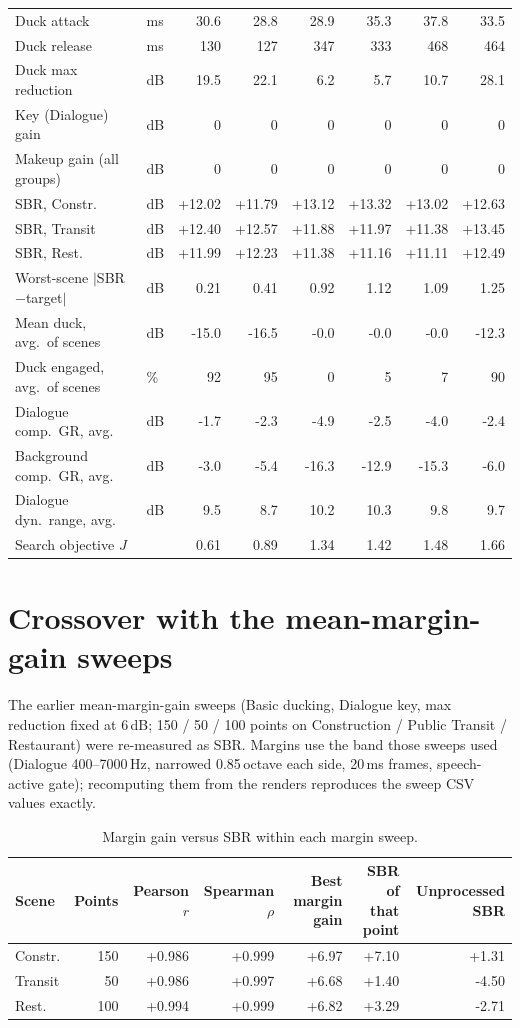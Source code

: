 \documentclass[11pt]{article}
\begin{document}
\begin{table}[H]
\begin{tabular}{@{}l l rrrrrr@{}}
Duck attack & ms & 30.6 & 28.8 & 28.9 & 35.3 & 37.8 & 33.5 \\
Duck release & ms & 130 & 127 & 347 & 333 & 468 & 464 \\
Duck max reduction & dB & 19.5 & 22.1 & 6.2 & 5.7 & 10.7 & 28.1 \\
Key (Dialogue) gain & dB & 0 & 0 & 0 & 0 & 0 & 0 \\
Makeup gain (all groups) & dB & 0 & 0 & 0 & 0 & 0 & 0 \\
\midrule
SBR, Constr. & dB & +12.02 & +11.79 & +13.12 & +13.32 & +13.02 & +12.63 \\
SBR, Transit & dB & +12.40 & +12.57 & +11.88 & +11.97 & +11.38 & +13.45 \\
SBR, Rest. & dB & +11.99 & +12.23 & +11.38 & +11.16 & +11.11 & +12.49 \\
Worst-scene $|$SBR$-$target$|$ & dB & 0.21 & 0.41 & 0.92 & 1.12 & 1.09 & 1.25 \\
Mean duck, avg.\ of scenes & dB & -15.0 & -16.5 & -0.0 & -0.0 & -0.0 & -12.3 \\
Duck engaged, avg.\ of scenes & \% & 92 & 95 & 0 & 5 & 7 & 90 \\
Dialogue comp.\ GR, avg.\ & dB & -1.7 & -2.3 & -4.9 & -2.5 & -4.0 & -2.4 \\
Background comp.\ GR, avg.\ & dB & -3.0 & -5.4 & -16.3 & -12.9 & -15.3 & -6.0 \\
Dialogue dyn.\ range, avg.\ & dB & 9.5 & 8.7 & 10.2 & 10.3 & 9.8 & 9.7 \\
Search objective $J$ & & 0.61 & 0.89 & 1.34 & 1.42 & 1.48 & 1.66 \\
\bottomrule
\end{tabular}
\end{table}

\clearpage

\section{Crossover with the mean-margin-gain sweeps}
The earlier mean-margin-gain sweeps (Basic ducking, Dialogue key, max reduction fixed at 6\,dB; 150 / 50 / 100 points on Construction / Public Transit / Restaurant) were re-measured as SBR. Margins use the band those sweeps used (Dialogue 400--7000\,Hz, narrowed 0.85\,octave each side, 20\,ms frames, speech-active gate); recomputing them from the renders reproduces the sweep CSV values exactly.

\begin{table}[H]\centering\small
\caption{Margin gain versus SBR within each margin sweep.}
\begin{tabular}{@{}lrrrrrr@{}}\toprule
Scene & Points & Pearson $r$ & Spearman $\rho$ & Best margin gain & SBR of that point & Unprocessed SBR \\\midrule
Constr. & 150 & +0.986 & +0.999 & +6.97 & +7.10 & +1.31 \\
Transit & 50 & +0.986 & +0.997 & +6.68 & +1.40 & -4.50 \\
Rest. & 100 & +0.994 & +0.999 & +6.82 & +3.29 & -2.71 \\
\bottomrule\end{tabular}\end{table}
\end{document}
